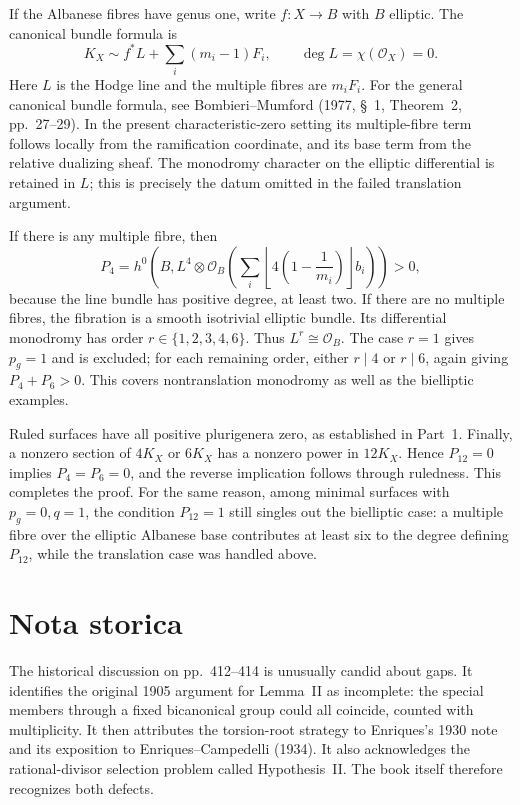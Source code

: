 If the Albanese fibres have genus one, write $f:X\to B$ with $B$ elliptic. The canonical bundle formula is
\[
 K_X\sim f^*L+\sum_i(m_i-1)F_i,
 \qquad \deg L=\chi(\mathcal O_X)=0.
\]
Here $L$ is the Hodge line and the multiple fibres are $m_iF_i$. For the general canonical bundle formula, see Bombieri--Mumford (1977, \S~1, Theorem~2, pp.~27--29). In the present characteristic-zero setting its multiple-fibre term follows locally from the ramification coordinate, and its base term from the relative dualizing sheaf. The monodromy character on the elliptic differential is retained in $L$; this is precisely the datum omitted in the failed translation argument.

If there is any multiple fibre, then
\[
 P_4=h^0\!\left(B,L^4\otimes
 \mathcal O_B\left(\sum_i\left\lfloor4\left(1-\frac1{m_i}\right)\right\rfloor b_i\right)\right)>0,
\]
because the line bundle has positive degree, at least two. If there are no multiple fibres, the fibration is a smooth isotrivial elliptic bundle. Its differential monodromy has order $r\in\{1,2,3,4,6\}$. Thus $L^r\cong\mathcal O_B$. The case $r=1$ gives $p_g=1$ and is excluded; for each remaining order, either $r\mid4$ or $r\mid6$, again giving $P_4+P_6>0$. This covers nontranslation monodromy as well as the bielliptic examples.

Ruled surfaces have all positive plurigenera zero, as established in Part~1. Finally, a nonzero section of $4K_X$ or $6K_X$ has a nonzero power in $12K_X$. Hence $P_{12}=0$ implies $P_4=P_6=0$, and the reverse implication follows through ruledness. This completes the proof. For the same reason, among minimal surfaces with $p_g=0,q=1$, the condition $P_{12}=1$ still singles out the bielliptic case: a multiple fibre over the elliptic Albanese base contributes at least six to the degree defining $P_{12}$, while the translation case was handled above.

\section{Nota storica}
\label{cp2-x-15}

The historical discussion on pp.~412--414 is unusually candid about gaps. It identifies the original 1905 argument for Lemma~II as incomplete: the special members through a fixed bicanonical group could all coincide, counted with multiplicity. It then attributes the torsion-root strategy to Enriques's 1930 note and its exposition to Enriques--Campedelli (1934). It also acknowledges the rational-divisor selection problem called Hypothesis~II. The book itself therefore recognizes both defects.

